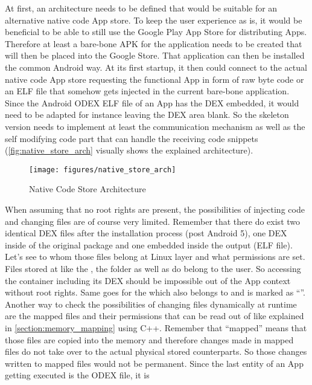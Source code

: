At first, an architecture needs to be defined that would be suitable for an alternative native code App store. To keep the user experience as is, it would be beneficial to be able to still use the Google Play App Store for distributing Apps. Therefore at least a bare-bone APK for the application needs to be created that will then be placed into the Google Store.
That application can then be installed the common Android way. At its first startup, it then could connect to the actual native code App store
requesting the functional App in form of raw byte code or an ELF file that
somehow gets injected in the current bare-bone application.
Since the Android ODEX ELF file of an App has the DEX embedded, it would need to be adapted for instance leaving the DEX area blank.
So the skeleton version needs to implement at least the communication mechanism as well as the self modifying code part that can handle the receiving code snippets (\autoref{fig:native_store_arch} visually shows
the explained architecture).
\begin{figure}[htb]
  \centering
  \texttt{[image: figures/native\_store\_arch]}
  \caption[Native Code Store Architecture]{Native Code Store Architecture}
  \label{fig:native_store_arch}
\end{figure}
When assuming that no root rights are present, the possibilities of injecting code and changing files are of course very limited. Remember that there do exist two identical DEX files after the installation process (post Android 5), one DEX inside of the original  package and one embedded inside the  output (ELF file).
Let's see to whom those files belong at Linux layer and what permissions are set. Files stored at  like the , the 
folder as well as  do belong to the  user. So accessing the  container including its DEX should be
impossible out of the App context without root rights. Same goes for the
 which also belongs to  and is marked as
``''.
Another way to check the possibilities of changing files dynamically at runtime are the mapped files and their permissions that can be read out of  like explained in \autoref{section:memory_mapping} using C++.
Remember that ``mapped'' means that those files are copied into the memory
and therefore changes made in mapped files do not take over to the actual
physical stored counterparts. So those changes written to mapped files would
not be permanent.
Since the last entity of an App getting executed is the ODEX file, it is
